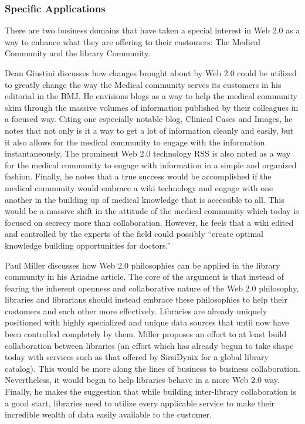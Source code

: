 \documentclass[12pt,oneside,letterpaper]{article}
\begin{document}
\subsubsection{Specific Applications}

There are two business domains that have taken a special interest in Web 2.0 as
a way to enhance what they are offering to their customers: The Medical
Community and the library Community.

Dean Giustini \citeyearpar{giustini2006} discusses how changes brought about by
Web 2.0 could be utilized to greatly change the way the Medical community serves
its customers in his editorial in the BMJ.  He envisions blogs as a way to help
the medical community skim through the massive volumes of information published
by their colleagues in a focused way.  Citing one especially notable blog,
Clinical Cases and Images, he notes that not only is it a way to get a lot of
information cleanly and easily, but it also allows for the medical community to
engage with the information instantaneously.  The prominent Web 2.0 technology
RSS is also noted as a way for the medical community to engage with information
in a simple and organized fashion.  Finally, he notes that a true success would
be accomplished if the medical community would embrace a wiki technology and
engage with one another in the building up of medical knowledge that is
accessible to all.  This would be a massive shift in the attitude of the medical
community which today is focused on secrecy more than collaboration.  However,
he feels that a wiki edited and controlled by the experts of the field could
possibly ``create optimal knowledge building opportunities for doctors.''

Paul Miller \citeyearpar{miller2005} discusses how Web 2.0 philosophies can be
applied in the library community in his Ariadne article.  The core of the
argument is that instead of fearing the inherent openness and collaborative
nature of the Web 2.0 philosophy, libraries and librarians should instead
embrace these philosophies to help their customers and each other more
effectively.  Libraries are already uniquely positioned with highly specialized
and unique data sources that until now have been controlled completely by them.
Miller proposes an effort to at least build collaboration between libraries (an
effort which has already begun to take shape today with services such as that
offered by SirsiDynix for a global library catalog).  This would be more along
the lines of business to business collaboration.  Nevertheless, it would begin
to help libraries behave in a more Web 2.0 way.  Finally, he makes the
suggestion that while building inter-library collaboration is a good start,
libraries need to utilize every applicable service to make their incredible
wealth of data easily available to the customer.
\end{document}

